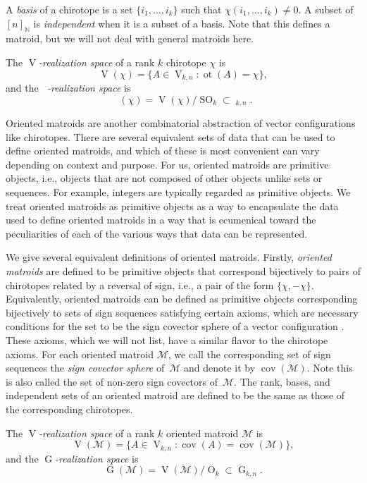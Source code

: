 \documentclass[11pt]{article}
\newcommand{\ie}{i.e.,\xspace}
\numberwithin{equation}{section}
\theoremstyle{remark}
\let\mc\mathcal
\let\mb\mathbb
\let\df\emph
\DeclareMathOperator{\g}{G}
\DeclareMathOperator{\oG}{\widetilde G}
\DeclareMathOperator{\orth}{O}
\DeclareMathOperator{\sorth}{SO}
\DeclareMathOperator{\stief}{V}
\DeclareMathOperator{\cov}{cov}
\DeclareMathOperator{\ot}{ot}
\begin{document}
A \df{basis} of a chirotope is a set $\{i_1,\dots,i_k\}$ such that $\chi(i_1,\dots,i_k) \neq 0$.
A subset of~$[n]_\mb{N}$ is \df{independent} when it is a subset of a basis.
Note that this defines a matroid, but we will not deal with general matroids here.

The \df{\hbox{$\stief$-realization} space} of a rank $k$ chirotope $\chi$ is
\[ \stief(\chi) =
\{ A \in \stief_{k,n}:\ot (A) = \chi\},
\]
and the \df{$\oG$-realization space} is
\[ \oG(\chi) = \stief(\chi)/\sorth_k \subset \oG_{k,n}. \]

Oriented matroids are another combinatorial abstraction of vector configurations like chirotopes.
There are several equivalent sets of data that can be used to define oriented matroids, and which of these is most convenient can vary depending on context and purpose.
For us, oriented matroids are primitive objects, \ie objects that are not composed of other objects unlike sets or sequences. For example, integers are typically regarded as primitive objects.
We treat oriented matroids as primitive objects as a way to encapsulate the data used to define oriented matroids in a way that is ecumenical toward the peculiarities of each of the various ways that data can be represented.

We give several equivalent definitions of oriented matroids.
Firstly, \df{oriented matroids} are defined to be primitive objects that correspond bijectively to pairs of chirotopes related by a reversal of sign, \ie a pair of the form $\{\chi,-\chi\}$.
Equivalently, oriented matroids can be defined as primitive objects corresponding bijectively to sets of sign sequences satisfying certain axioms, which are necessary conditions for the set to be the sign covector sphere of a vector configuration \cite[\S 3.7]{bjorner1999oriented}.
These axioms, which we will not list, have a similar flavor to the chirotope axioms.
For each oriented matroid $\mc{M}$, we call the corresponding set of sign sequences the \df{sign covector sphere} of~$\mc{M}$ and denote it by $\cov(\mc{M})$.
Note this is also called the set of non-zero sign covectors of~$\mc{M}$.
The rank, bases, and independent sets of an oriented matroid are defined to be the same as those of the corresponding chirotopes.

The \df{\hbox{$\stief$-realization} space} of a rank $k$ oriented matroid $\mc{M}$ is
\[ \stief(\mc{M}) =
\{ A \in \stief_{k,n}:\cov (A) = \cov(\mc{M})\},
\]
and the \df{$\g$-realization space} is
\[ \g(\mc{M}) = \stief(\mc{M})/\orth_k \subset \g_{k,n}. \]
\end{document}
